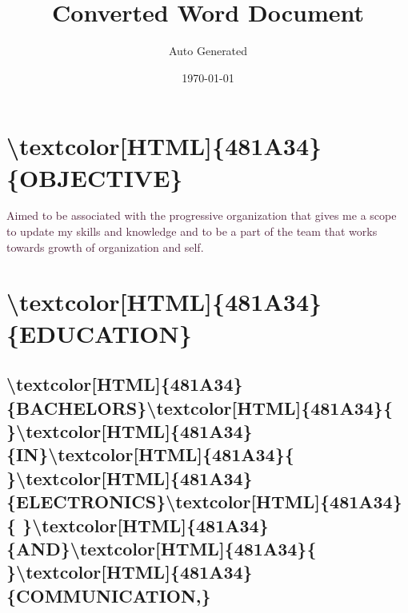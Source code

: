 \documentclass[12pt]{article}%
\title{Converted Word Document}%
\author{Auto Generated}%
\date{\today}%
\begin{document}
%
\normalsize%
%
\maketitle%
\tableofcontents%
\newpage%
\pagestyle{fancy}%
\section{\textbackslash{}textcolor{[}HTML{]}\{481A34\}\{OBJECTIVE\}}%
\label{sec:sec15}%

%
\begin{justify}%
\textcolor[HTML]{481A34}{Aimed to be associated }\textcolor[HTML]{481A34}{with the progressive}\textcolor[HTML]{481A34}{ }\textcolor[HTML]{481A34}{organization that gives me a scope to update my}\textcolor[HTML]{481A34}{ }\textcolor[HTML]{481A34}{skills and knowledge and to be a part of the}\textcolor[HTML]{481A34}{ }\textcolor[HTML]{481A34}{team}\textcolor[HTML]{481A34}{ }\textcolor[HTML]{481A34}{that}\textcolor[HTML]{481A34}{ }\textcolor[HTML]{481A34}{works}\textcolor[HTML]{481A34}{ }\textcolor[HTML]{481A34}{towards}\textcolor[HTML]{481A34}{ }\textcolor[HTML]{481A34}{growth}\textcolor[HTML]{481A34}{ }\textcolor[HTML]{481A34}{of}\textcolor[HTML]{481A34}{ }\textcolor[HTML]{481A34}{organization}\textcolor[HTML]{481A34}{ }\textcolor[HTML]{481A34}{and}\textcolor[HTML]{481A34}{ }\textcolor[HTML]{481A34}{self.}%
\end{justify}%
\newline%
%
\section{\textbackslash{}textcolor{[}HTML{]}\{481A34\}\{EDUCATION\}}%
\label{sec:sec18}%

%
\subsection{\textbackslash{}textcolor{[}HTML{]}\{481A34\}\{BACHELORS\}\textbackslash{}textcolor{[}HTML{]}\{481A34\}\{ \}\textbackslash{}textcolor{[}HTML{]}\{481A34\}\{IN\}\textbackslash{}textcolor{[}HTML{]}\{481A34\}\{ \}\textbackslash{}textcolor{[}HTML{]}\{481A34\}\{ELECTRONICS\}\textbackslash{}textcolor{[}HTML{]}\{481A34\}\{ \}\textbackslash{}textcolor{[}HTML{]}\{481A34\}\{AND\}\textbackslash{}textcolor{[}HTML{]}\{481A34\}\{ \}\textbackslash{}textcolor{[}HTML{]}\{481A34\}\{COMMUNICATION,\}}%
\label{subsec:subsec19}%
\end{document}
